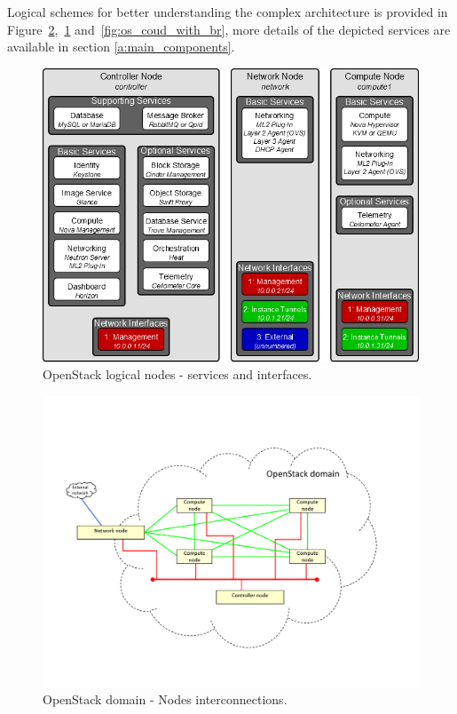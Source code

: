 Logical schemes for better understanding the complex architecture is provided in Figure~\ref{fig:os_cloud},~\ref{fig:OSarchitecture} and~\ref{fig:os_coud_with_br}, more details of the depicted services are available in section \ref{a:main_components}.
\begin{figure}[h]
	\centering
	\includegraphics[clip= true, width=0.8 \columnwidth]{images/openstack_nodes.png}
	\caption{OpenStack logical nodes - services and interfaces.}
	\label{fig:OSarchitecture}
\end{figure}
\begin{figure}[h]
	\centering
	\includegraphics[clip= true, width= \columnwidth, trim=0cm 1cm 0cm 3cm]{images/os_cloud.pdf}
	\caption{OpenStack domain - Nodes interconnections.}
	\label{fig:os_cloud}
\end{figure}
